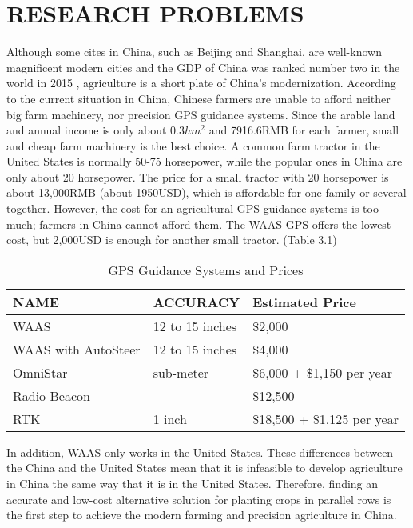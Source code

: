 \chapter{RESEARCH PROBLEMS}


Although some cites in China, such as Beijing and Shanghai, are well-known magnificent modern cities and the GDP of China was ranked number two in the world in 2015 \cite{GDP2015}, agriculture is a short plate of China's modernization. According to the current situation in China, Chinese farmers are unable to afford neither big farm machinery, nor precision GPS guidance systems. Since the arable land and annual income is only about 0.3$hm^{2}$ and 7916.6RMB for each farmer, small and cheap farm machinery is the best choice. A common farm tractor in the United States is normally 50-75 horsepower, while the popular ones in China are only about 20 horsepower. The price for a small tractor with 20 horsepower is about 13,000RMB (about 1950USD), which is affordable for one family or several together. However, the cost for an agricultural GPS guidance systems is too much; farmers in China cannot afford them. The WAAS GPS offers the lowest cost, but 2,000USD is enough for another small tractor. (Table 3.1) 
\begin{table}[ht!]
\caption{GPS Guidance Systems and Prices \cite{PriceR}}
\begin{center}	
\begin{tabular}{|l|l|l|}
\hline
NAME & ACCURACY & Estimated Price \\ 
\hline
WAAS & 12 to 15 inches & \$2,000 \\
\hline
WAAS with AutoSteer &  12 to 15 inches & \$4,000\\
\hline
OmniStar & sub-meter & \$6,000 + \$1,150 per year\\
\hline
Radio Beacon & - & \$12,500\\
\hline
RTK & 1 inch & \$18,500 + \$1,125 per year\\
\hline
\end{tabular}
\end{center}					
\end{table}
In addition, WAAS only works in the United States. These differences between the China and the United States mean that it is infeasible to develop agriculture in China the same way that it is in the United States. Therefore, finding an accurate and low-cost alternative solution for planting crops in parallel rows is the first step to achieve the modern farming and precision agriculture in China.

